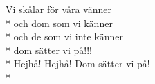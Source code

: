 \begin{SongText}
    \begin{SongVerse}
        Vi skålar för våra vänner\\*%
        och dom som vi känner\\*%
        och de som vi inte känner\\*%
        dom sätter vi på!!!\\*%
        Hejhå! Hejhå! Dom sätter vi på!\\*%
    \end{SongVerse}
\end{SongText}
